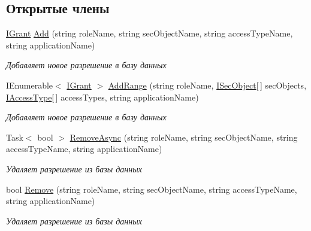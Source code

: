 \subsection*{Открытые члены}
\begin{DoxyCompactItemize}
\item 
\hyperlink{interface_security_1_1_interfaces_1_1_model_1_1_i_grant}{I\+Grant} \hyperlink{interface_security_1_1_interfaces_1_1_collections_1_1_i_grant_collection_a2cdefefae74247f9bdf9ff4445941466}{Add} (string role\+Name, string sec\+Object\+Name, string access\+Type\+Name, string application\+Name)
\begin{DoxyCompactList}\small\item\em Добавляет новое разрешение в базу данных \end{DoxyCompactList}\item 
I\+Enumerable$<$ \hyperlink{interface_security_1_1_interfaces_1_1_model_1_1_i_grant}{I\+Grant} $>$ \hyperlink{interface_security_1_1_interfaces_1_1_collections_1_1_i_grant_collection_afe2d893821ee31b43c864517764fd0c3}{Add\+Range} (string role\+Name, \hyperlink{interface_security_1_1_interfaces_1_1_model_1_1_i_sec_object}{I\+Sec\+Object}\mbox{[}$\,$\mbox{]} sec\+Objects, \hyperlink{interface_security_1_1_interfaces_1_1_model_1_1_i_access_type}{I\+Access\+Type}\mbox{[}$\,$\mbox{]} access\+Types, string application\+Name)
\begin{DoxyCompactList}\small\item\em Добавляет новое разрешение в базу данных \end{DoxyCompactList}\item 
Task$<$ bool $>$ \hyperlink{interface_security_1_1_interfaces_1_1_collections_1_1_i_grant_collection_a9cd84f3f6a51d9ec7c9f49bfc61ce55e}{Remove\+Async} (string role\+Name, string sec\+Object\+Name, string access\+Type\+Name, string application\+Name)
\begin{DoxyCompactList}\small\item\em Удаляет разрешение из базы данных \end{DoxyCompactList}\item 
bool \hyperlink{interface_security_1_1_interfaces_1_1_collections_1_1_i_grant_collection_a871aa197789be27f8d1b9e102abcba93}{Remove} (string role\+Name, string sec\+Object\+Name, string access\+Type\+Name, string application\+Name)
\begin{DoxyCompactList}\small\item\em Удаляет разрешение из базы данных \end{DoxyCompactList}\item 

\end{DoxyCompactItemize}
